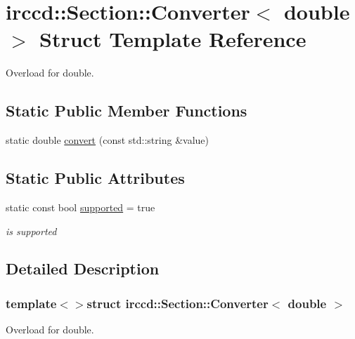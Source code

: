 \hypertarget{a00019}{\section{irccd\-:\-:Section\-:\-:Converter$<$ double $>$ Struct Template Reference}
\label{a00019}
}


Overload for double.  


\subsection*{Static Public Member Functions}
\begin{DoxyCompactItemize}
\item 
static double \hyperlink{a00019_a020820ce329c2361f3040a39f643dc1f}{convert} (const std\-::string \&value)
\end{DoxyCompactItemize}
\subsection*{Static Public Attributes}
\begin{DoxyCompactItemize}
\item 
\hypertarget{a00019_a2b149eb9d961e11cc34fe99889aff80b}{static const bool \hyperlink{a00019_a2b149eb9d961e11cc34fe99889aff80b}{supported} = true}\label{a00019_a2b149eb9d961e11cc34fe99889aff80b}

\begin{DoxyCompactList}\small\item\em is supported \end{DoxyCompactList}\end{DoxyCompactItemize}


\subsection{Detailed Description}
\subsubsection*{template$<$$>$struct irccd\-::\-Section\-::\-Converter$<$ double $>$}

Overload for double. 

